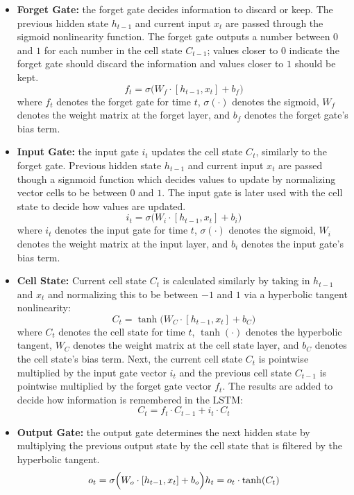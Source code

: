 \begin{itemize}
    \item \textbf{Forget Gate: } the forget gate decides information to discard or keep. The previous hidden state $h_{t-1}$ and current input $x_t$ are passed through the sigmoid nonlinearity function. The forget gate outputs a number between $0$ and $1$ for each number in the cell state $C_{t-1}$; values closer to $0$ indicate the forget gate should discard the information and values closer to $1$ should be kept. 
    $$
    f_t = \sigma \Big( W_f \cdot [h_{t-1}, x_t] + b_f \Big)
    $$
    where $f_t$ denotes the forget gate for time $t$, $\sigma(\cdot)$ denotes the sigmoid, $W_f$ denotes the weight matrix at the forget layer, and $b_f$ denotes the forget gate's bias term. 
    
    \item \textbf{Input Gate: } the input gate $i_t$ updates the cell state $C_t$, similarly to the forget gate. Previous hidden state $h_{t-1}$ and current input $x_t$ are passed though a signmoid function which decides values to update by normalizing vector cells to be between $0$ and $1$. The input gate is later used with the cell state to decide how values are updated. 
    $$
    i_t = \sigma \Big( W_i \cdot [h_{t-1}, x_t] + b_i \Big)
    $$
    where $i_t$ denotes the input gate for time $t$, $\sigma(\cdot)$ denotes the sigmoid, $W_i$ denotes the weight matrix at the input layer, and $b_i$ denotes the input gate's bias term. 
    
    \item \textbf{Cell State: } Current cell state $C_t$ is calculated similarly by taking in $h_{t-1}$ and $x_t$ and normalizing this to be between $-1$ and $1$ via a hyperbolic tangent nonlinearity:
    $$
    C_t = \tanh \Big( W_C \cdot [h_{t-1}, x_t] + b_C \Big)
    $$
    where $C_t$ denotes the cell state for time $t$, $\tanh(\cdot)$ denotes the hyperbolic tangent, $W_C$ denotes the weight matrix at the cell state layer, and $b_C$ denotes the cell state's bias term. 
    Next, the current cell state $C_t$ is pointwise multiplied by the input gate vector $i_t$ and the previous cell state $C_{t-1}$ is pointwise  multiplied by the forget gate vector $f_t$. The results are added to decide how information is remembered in the LSTM:
    $$
    C_t = f_t \cdot C_{t-1} + i_t \cdot C_t
    $$
    
    \item \textbf{Output Gate: }the output gate determines the next hidden state by multiplying the previous output state by the cell state that is filtered by the hyperbolic tangent. 
    $$
    o_t = \sigma \Big( W_o \cdot [h_{t-1}, x_t] + b_o \Big) \\
    h_t = o_t \cdot \tanh(C_t)
    $$
    
\end{itemize}



